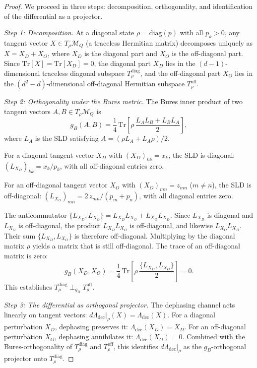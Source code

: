 \documentclass[12pt,a4paper]{article}
\theoremstyle{definition}
\theoremstyle{remark}
\begin{document}
\begin{proof}
We proceed in three steps: decomposition, orthogonality, and identification of the differential as a projector.

\emph{Step 1: Decomposition.}  At a diagonal state $\rho = \mathrm{diag}(p)$ with all $p_k > 0$, any tangent vector $X \in T_\rho \mathcal{M}_Q$ (a traceless Hermitian matrix) decomposes uniquely as $X = X_D + X_O$, where $X_D$ is the diagonal part and $X_O$ is the off-diagonal part.  Since $\mathrm{Tr}[X] = \mathrm{Tr}[X_D] = 0$, the diagonal part $X_D$ lies in the $(d-1)$-dimensional traceless diagonal subspace $T_\rho^{\mathrm{diag}}$, and the off-diagonal part $X_O$ lies in the $(d^2 - d)$-dimensional off-diagonal Hermitian subspace $T_\rho^{\mathrm{off}}$.

\emph{Step 2: Orthogonality under the Bures metric.}  The Bures inner product of two tangent vectors $A, B \in T_\rho \mathcal{M}_Q$ is
\[
g_B(A, B) = \frac{1}{4}\,\mathrm{Tr}\!\left[\rho\,\frac{L_A L_B + L_B L_A}{2}\right],
\]
where $L_A$ is the SLD satisfying $A = (\rho L_A + L_A \rho)/2$.

For a diagonal tangent vector $X_D$ with $(X_D)_{kk} = x_k$, the SLD is diagonal: $(L_{X_D})_{kk} = x_k / p_k$, with all off-diagonal entries zero.

For an off-diagonal tangent vector $X_O$ with $(X_O)_{mn} = z_{mn}$ ($m \neq n$), the SLD is off-diagonal: $(L_{X_O})_{mn} = 2\, z_{mn} / (p_m + p_n)$, with all diagonal entries zero.

The anticommutator $\{L_{X_D}, L_{X_O}\} = L_{X_D} L_{X_O} + L_{X_O} L_{X_D}$.  Since $L_{X_D}$ is diagonal and $L_{X_O}$ is off-diagonal, the product $L_{X_D} L_{X_O}$ is off-diagonal, and likewise $L_{X_O} L_{X_D}$.  Their sum $\{L_{X_D}, L_{X_O}\}$ is therefore off-diagonal.  Multiplying by the diagonal matrix $\rho$ yields a matrix that is still off-diagonal.  The trace of an off-diagonal matrix is zero:
\[
g_B(X_D, X_O) = \frac{1}{4}\,\mathrm{Tr}\!\left[\rho\,\frac{\{L_{X_D}, L_{X_O}\}}{2}\right] = 0.
\]
This establishes $T_\rho^{\mathrm{diag}} \perp_{g_B} T_\rho^{\mathrm{off}}$.

\emph{Step 3: The differential as orthogonal projector.}  The dephasing channel acts linearly on tangent vectors: $d\Lambda_{\mathrm{dec}}|_\rho(X) = \Lambda_{\mathrm{dec}}(X)$.  For a diagonal perturbation $X_D$, dephasing preserves it: $\Lambda_{\mathrm{dec}}(X_D) = X_D$.  For an off-diagonal perturbation $X_O$, dephasing annihilates it: $\Lambda_{\mathrm{dec}}(X_O) = 0$.  Combined with the Bures-orthogonality of $T_\rho^{\mathrm{diag}}$ and $T_\rho^{\mathrm{off}}$, this identifies $d\Lambda_{\mathrm{dec}}|_\rho$ as the $g_B$-orthogonal projector onto $T_\rho^{\mathrm{diag}}$.
\end{proof}
\end{document}
